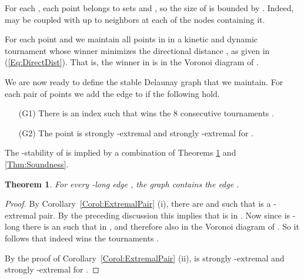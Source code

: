 \documentclass[letter,11pt]{article}
\newtheorem{theorem}{Theorem}[section]
\begin{document}
For each , each
point  belongs to  sets  and , so the size of
 is bounded by . Indeed,  may be coupled with up to  neighbors at each of the  nodes containing it.

For each point  and  we 
maintain all points in  in a kinetic and dynamic
tournament  whose winner  minimizes
the directional distance , as given in (\ref{Eq:DirectDist}). That is, 
the winner in  is  in the Voronoi diagram of
. 

We are now ready to define the stable Delaunay graph  that we maintain.
For each pair of points  we add the edge  to  if 
the following hold.
\begin{itemize}
\item[(G1)] There is an index  such that  wins the 8
consecutive tournaments .
\item[(G2)] The point  is strongly -extremal and strongly
-extremal for .
\end{itemize}

The -stability of  is implied by a combination of Theorems \ref{Thm:Completeness} and \ref{Thm:Soundness}.
\begin{theorem}\label{Thm:Completeness}
For every -long edge , the graph 
contains the edge .
\end{theorem}
\begin{proof}
By Corollary~\ref{Corol:ExtremalPair} (i), 
there are  and  such that  is a -extremal pair.
By the preceding discussion this implies that  is in .
 Now since  is  -long 
  there is an  such that 
 in , and therefore also
in the Voronoi diagram of .
So it follows that  indeed wins the tournaments
 .

By the proof of Corollary~\ref{Corol:ExtremalPair} (ii),  is
strongly  -extremal and
strongly -extremal for .
\end{proof}
\end{document}
